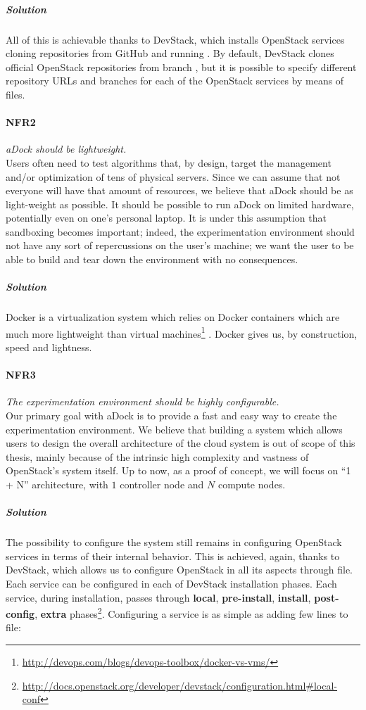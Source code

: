 \subparagraph{Solution} All of this is achievable thanks to DevStack, which installs OpenStack services cloning repositories from GitHub and running . By default, DevStack clones official OpenStack repositories from branch , but it is possible to specify different repository URLs and branches for each of the OpenStack services by means of  files.

\paragraph{NFR2}\label{p:nfr2} \emph{aDock should be lightweight.} \hfill \\
Users often need to test algorithms that, by design, target the management and/or optimization of tens of physical servers. Since we can assume that not everyone will have that amount of resources, we believe that aDock should be as light-weight as possible. It should be possible to run aDock on limited hardware, potentially even on one's personal laptop. It is under this assumption that sandboxing becomes important; indeed, the experimentation environment should not have any sort of repercussions on the user's machine; we want the user to be able to build and tear down the environment with no consequences.

\subparagraph{Solution} Docker is a virtualization system which relies on Docker containers which are much more lightweight than virtual machines\footnote{\url{http://devops.com/blogs/devops-toolbox/docker-vs-vms/}} . Docker gives us, by construction, speed and lightness.

\paragraph{NFR3}\label{p:nfr3} \emph{The experimentation environment should be highly configurable.} \hfill \\
Our primary goal with aDock is to provide a fast and easy way to create the experimentation environment. We believe that building a system which allows users to design the overall architecture of the cloud system is out of scope of this thesis, mainly because of the intrinsic high complexity and vastness of OpenStack's system itself. Up to now, as a proof of concept, we will focus on ``1 + N'' architecture, with $1$ controller node and $N$ compute nodes.

\subparagraph{Solution} The possibility to configure the system still remains in configuring OpenStack services in terms of their internal behavior. This is achieved, again, thanks to DevStack, which allows us to configure OpenStack in all its aspects through  file. Each service can be configured in each of DevStack installation phases. Each service, during installation, passes through \textbf{local}, \textbf{pre-install}, \textbf{install}, \textbf{post-config}, \textbf{extra} phases\footnote{\url{http://docs.openstack.org/developer/devstack/configuration.html\#local-conf}}. Configuring a service is as simple as adding few lines to  file:

